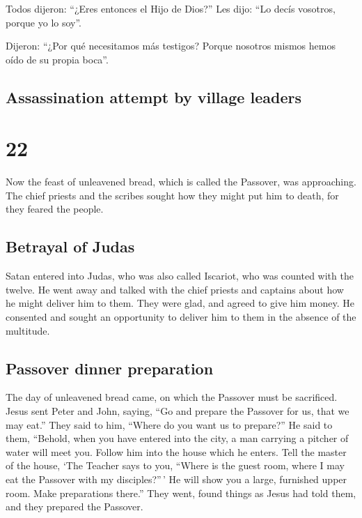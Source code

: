 \begin{paracol}{2}
\begin{otherlanguage}{english}
 Todos dijeron: ``¿Eres entonces el Hijo de Dios?'' Les
dijo: ``Lo decís vosotros, porque yo lo soy''.

 Dijeron: ``¿Por qué necesitamos más testigos? Porque
nosotros mismos hemos oído de su propia boca''.

\switchcolumn
\begin{otherlanguage}{english}

\hypertarget{assassination-attempt-by-village-leaders}{%
\subsection{Assassination attempt by village
leaders}\label{assassination-attempt-by-village-leaders}}

\hypertarget{section-26}{%
\section{22}\label{section-26}}

 Now the feast of unleavened bread, which is called the
Passover, was approaching.  The chief priests and the
scribes sought how they might put him to death, for they feared the
people.

\hypertarget{betrayal-of-judas}{%
\subsection{Betrayal of Judas}\label{betrayal-of-judas}}

 Satan entered into Judas, who was also called Iscariot,
who was counted with the twelve.  He went away and talked
with the chief priests and captains about how he might deliver him to
them.  They were glad, and agreed to give him money.
 He consented and sought an opportunity to deliver him to
them in the absence of the multitude.

\hypertarget{passover-dinner-preparation}{%
\subsection{Passover dinner
preparation}\label{passover-dinner-preparation}}

 The day of unleavened bread came, on which the Passover
must be sacrificed.  Jesus sent Peter and John, saying,
``Go and prepare the Passover for us, that we may eat.'' 
They said to him, ``Where do you want us to prepare?'' 
He said to them, ``Behold, when you have entered into the city, a man
carrying a pitcher of water will meet you. Follow him into the house
which he enters.  Tell the master of the house, `The
Teacher says to you, ``Where is the guest room, where I may eat the
Passover with my disciples?''\,'  He will show you a
large, furnished upper room. Make preparations there.'' 
They went, found things as Jesus had told them, and they prepared the
Passover.


\end{otherlanguage}
\end{otherlanguage}
\end{paracol}
